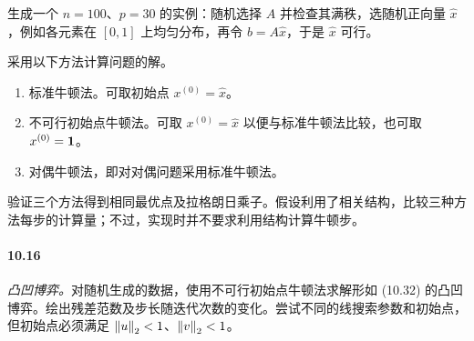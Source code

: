 生成一个 $n=100$、$p=30$ 的实例：随机选择 $A$ 并检查其满秩，选随机正向量 $\widehat x$，例如各元素在 $[0,1]$ 上均匀分布，再令 $b=A\widehat x$，于是 $\widehat x$ 可行。

采用以下方法计算问题的解。
\begin{enumerate}[label=(\alph*)]
\item 标准牛顿法。可取初始点 $x^{(0)}=\widehat x$。
\item 不可行初始点牛顿法。可取 $x^{(0)}=\widehat x$ 以便与标准牛顿法比较，也可取 $x^{(0)}=\mathbf 1$。
\item 对偶牛顿法，即对对偶问题采用标准牛顿法。
\end{enumerate}
验证三个方法得到相同最优点及拉格朗日乘子。假设利用了相关结构，比较三种方法每步的计算量；不过，实现时并不要求利用结构计算牛顿步。

\paragraph{10.16} \emph{凸凹博弈。}对随机生成的数据，使用不可行初始点牛顿法求解形如 (10.32) 的凸凹博弈。绘出残差范数及步长随迭代次数的变化。尝试不同的线搜索参数和初始点，但初始点必须满足 $\left\lVert u\right\rVert_2<1$、$\left\lVert v\right\rVert_2<1$。
